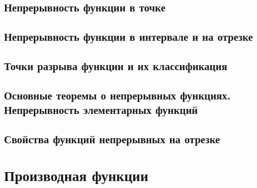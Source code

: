\documentclass[14pt]{extreport}
\begin{document}
\section{Непрерывность функции в точке}

\section{Непрерывность функции в интервале и на отрезке}

\section{Точки разрыва функции и их классификация}

\section{Основные теоремы о непрерывных функциях. Непрерывность элементарных функций}

\section{Свойства функций непрерывных на отрезке}



\chapter{Производная функции}
\end{document}
